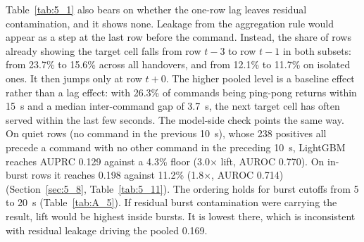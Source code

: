 \begin{table}[htbp]
\centering
\caption{The alignment audit: share of handovers whose target cell already serves in export rows around the command.}
\label{tab:5_1}
\vspace{0.4em}
\singlespacing
\footnotesize
{}
\end{table}

Table~\ref{tab:5_1} also bears on whether the one-row lag leaves residual contamination, and it shows none. Leakage from the aggregation rule would appear as a step at the last row before the command. Instead, the share of rows already showing the target cell falls from row $t-3$ to row $t-1$ in both subsets: from 23.7\% to 15.6\% across all handovers, and from 12.1\% to 11.7\% on isolated ones. It then jumps only at row $t+0$. The higher pooled level is a baseline effect rather than a lag effect: with 26.3\% of commands being ping-pong returns within 15~s and a median inter-command gap of 3.7~s, the next target cell has often served within the last few seconds. The model-side check points the same way. On quiet rows (no command in the previous 10~s), whose 238 positives all precede a command with no other command in the preceding 10~s, LightGBM reaches AUPRC 0.129 against a 4.3\% floor (3.0$\times$ lift, AUROC 0.770). On in-burst rows it reaches 0.198 against 11.2\% (1.8$\times$, AUROC 0.714) (Section~\ref{sec:5_8}, Table~\ref{tab:5_11}). The ordering holds for burst cutoffs from 5 to 20~s (Table~\ref{tab:A_5}). If residual burst contamination were carrying the result, lift would be highest inside bursts. It is lowest there, which is inconsistent with residual leakage driving the pooled 0.169.


